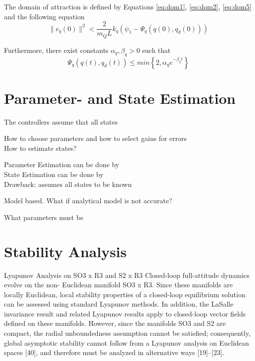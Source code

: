 The domain of attraction is defined by Equations \ref{eq:dom1}, \ref{eq:dom2}, \ref{eq:dom5} and the following equation
\begin{equation}
\parallel e_{\dot{q}}(0)\parallel^2<\frac{2}{m_QL}{k_q}(\psi_1-\Psi_q(q(0),q_d(0)))
\end{equation}


Furthermore, there exist constants $ \alpha_q,\beta_q>0 $ such that
\begin{equation}\label{key}
\Psi_q(q(t),q_d(t)) \leq min\left\lbrace 2,\alpha_qe^{-\beta_qt}\right\rbrace 
\end{equation}

\section{Parameter- and State Estimation}\label{sec:con.par}
The controllers assume that all states 

How to choose parameters and how to select gains for errors\\

How to estimate states?

Parameter Estimation can be done by\\

State Estimation can be done by\\

Drawback: assumes all states to be known

Model based. What if analytical model is not accurate?

What parameters must be 

\section{Stability Analysis}\label{sec:con.sta}
Lyapunov Analysis on SO3 x R3 and S2 x R3
Closed-loop full-attitude dynamics evolve on the non- Euclidean manifold SO3 x R3. 
Since these manifolds are locally Euclidean, local stability properties of a closed-loop equilibrium solution can be assessed using standard Lyapunov methods. 
In addition, the LaSalle invariance result and related Lyapunov results apply to closed-loop vector fields defined on these manifolds. 
However, since the manifolds SO3 and S2 are compact, the radial unboundedness assumption cannot be satisfied; 
consequently, global asymptotic stability cannot follow from a Lyapunov analysis on Euclidean spaces [40], and therefore must be analyzed in alternative ways [19]–[23].\cite[p.43]{Chaturvedi2011}

